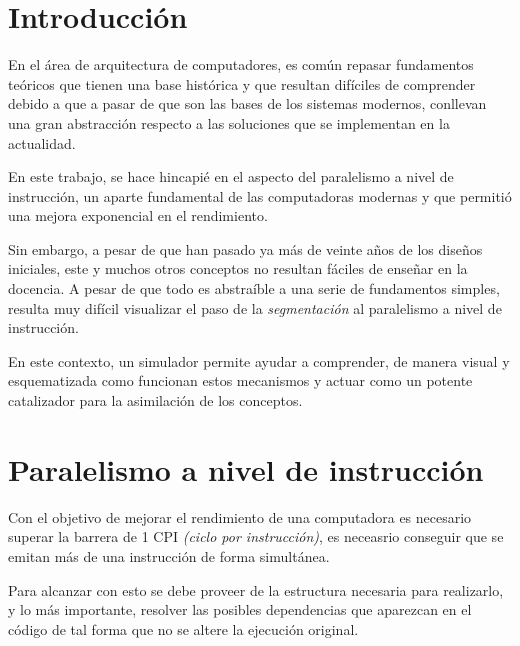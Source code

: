 
\section{Introducción}
\label{1:sec:1}

En el área de arquitectura de computadores, es común repasar fundamentos teóricos
que tienen una base histórica y que resultan difíciles de comprender debido 
a que a pasar de que son las bases de los sistemas modernos, conllevan 
una gran abstracción respecto a las soluciones que se implementan en la actualidad.

\bigskip
En este trabajo, se hace hincapié en el aspecto del paralelismo a nivel de instrucción, 
un aparte fundamental de las computadoras modernas y que permitió una mejora exponencial
en el rendimiento.

\bigskip
Sin embargo, a pesar de que han pasado ya más de veinte años de los diseños iniciales,
este y muchos otros conceptos no resultan fáciles de enseñar en la docencia. A pesar de que 
todo es abstraíble a una serie de fundamentos simples, resulta muy difícil visualizar el 
paso de la \textit{segmentación} al paralelismo a nivel de instrucción.

\bigskip
En este contexto, un simulador permite ayudar a comprender, de manera visual y esquematizada
como funcionan estos mecanismos y actuar como un potente catalizador para la asimilación de los 
conceptos.


\section{Paralelismo a nivel de instrucción}
\label{1:sec:2}

Con el objetivo de mejorar el rendimiento de una computadora es necesario superar la barrera
de 1 CPI \textit{(ciclo por instrucción)}, es neceasrio conseguir que se emitan más de una instrucción
de forma simultánea.

\bigskip
Para alcanzar con esto se debe proveer de la estructura necesaria para realizarlo, y lo más importante,
resolver las posibles dependencias que aparezcan en el código de tal forma que no se altere la 
ejecución original.

